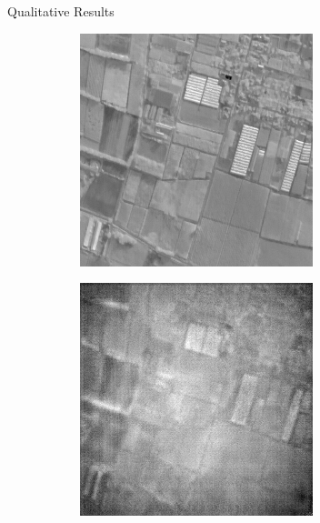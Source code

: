 \documentclass[final]{beamer}
\newlength{\colwidth}
\begin{document}
\begin{frame}[t]
\begin{columns}[t]
\begin{column}{\colwidth}
\begin{block}{Qualitative Results}
\begin{figure}
        \centering
        \begin{subfigure}[b]{0.19\textwidth}
            \centering
            \includegraphics[width=\textwidth]{../figs/outputs/pan/24.png}
        \end{subfigure}
        \hfill
        \begin{subfigure}[b]{0.19\textwidth}
            \centering
            \includegraphics[width=\textwidth]{../figs/outputs/cycleGan/24.png}

\end{subfigure}
\end{figure}
\end{block}
\end{column}
\end{columns}
\end{frame}
\end{document}
